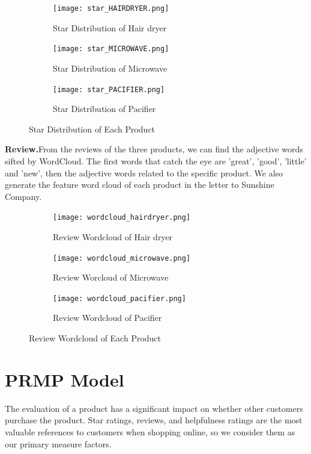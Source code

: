 \documentclass[12pt]{article}  %
\begin{document}
\begin{figure}[h]
	\centering
	\begin{subfigure}[b]{.32\textwidth}
		\centering
		\texttt{[image: star\_HAIRDRYER.png]}
		\caption{Star Distribution of Hair dryer }
	\end{subfigure}
	\begin{subfigure}[b]{.32\textwidth}
		\centering
		\texttt{[image: star\_MICROWAVE.png]}
		\caption{Star Distribution of Microwave}
	\end{subfigure}	
	\begin{subfigure}[b]{.32\textwidth}
		\centering
		\texttt{[image: star\_PACIFIER.png]}
		\caption{Star Distribution of Pacifier}
	\end{subfigure}	
	\caption{Star Distribution of Each Product}
	\label{fig:fig1}
\end{figure}

\textbf{Review.}From the reviews of the three products, we can find the adjective words sifted by WordCloud. The first words that catch the eye are 'great', 'good', 'little' and 'new', then the adjective words related to the specific product. We also generate the feature word cloud of each product in the letter to Sunshine Company.

\begin{figure}[h]
	\centering
	\begin{subfigure}[b]{.32\textwidth}
		\centering
		\texttt{[image: wordcloud\_hairdryer.png]}
		\caption{Review Wordcloud of Hair dryer}
	\end{subfigure}
	\begin{subfigure}[b]{.32\textwidth}
		\centering
		\texttt{[image: wordcloud\_microwave.png]}
		\caption{Review Worcloud of Microwave}
	\end{subfigure}	
	\begin{subfigure}[b]{.32\textwidth}
		\centering
		\texttt{[image: wordcloud\_pacifier.png]}
		\caption{Review Wordcloud of Pacifier}
	\end{subfigure}	
	\caption{Review Wordcloud of Each Product}
	\label{fig:fig2}
\end{figure}


\section{PRMP Model}
The evaluation of a product has a significant impact on whether other customers purchase the product. Star ratings, reviews, and helpfulness ratings are the most valuable references to customers when shopping online, so we consider them as our primary measure factors.
\end{document}
